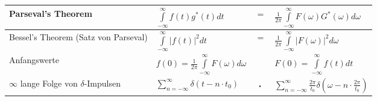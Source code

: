 \begin{tabular}{|p{8cm}|l c l|}
 			\hline
        	Parseval's Theorem &
 			$\int\limits_{-\infty}^{\infty}f(t)g^{\ast}(t)dt $ & $=$ & $ \frac{1}{2\pi}
  			\int\limits_{-\infty}^{\infty}F(\omega)G^{\ast}(\omega)d\omega$\\
  			\hline
  			Bessel's Theorem (Satz von Parseval) &
  			$\int\limits_{-\infty}^{\infty}|f(t)|^2 dt $ & $=$ & $ \frac{1}{2\pi}
  			\int\limits_{-\infty}^{\infty}|F(\omega)|^2 d\omega$\\
  			\hline 			
			Anfangswerte &
			$f(0)=\frac{1}{2\pi}\int\limits_{-\infty}^{\infty}F(\omega)d\omega
			$ && $ F(0)=\int\limits_{-\infty}^{\infty}f(t)dt$\\
			\hline
			$\infty$ lange Folge von $\delta$-Impulsen &
			$\sum\limits_{n=-\infty}^{\infty} \delta(t-n\cdot t_0)$ & $\FT$ & 
			$\sum\limits_{n=-\infty}^{\infty}
			\frac{2\pi}{t_0}\delta(\omega-n\cdot \frac{2\pi}{t_0})$\\
			\hline
        \end{tabular}
		\renewcommand{\arraystretch}{1}
		
	